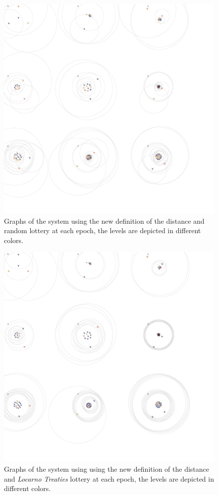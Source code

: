 \documentclass[a4paper,11pt,twoside=semi,openright]{report}
\begin{document}
\begin{figure}[!h] 
\centering
\includegraphics[width=350pt]{figures/SpaceTime-Random}
\caption{Graphs of the system using the new definition of the distance and random lottery at each epoch, the levels are depicted in different colors.}
\label{fig:SpaceTime-Random}
\end{figure}

\begin{figure}[!h] 
\centering
\includegraphics[width=500pt]{figures/SpaceTime-Locarno}
\caption{Graphs of the system using  using the new definition of the distance and \textit{Locarno Treaties} lottery at each epoch, the levels are depicted in different colors.}
  \label{fig:SpaceTime-Locarno}
\end{figure}
\end{document}
